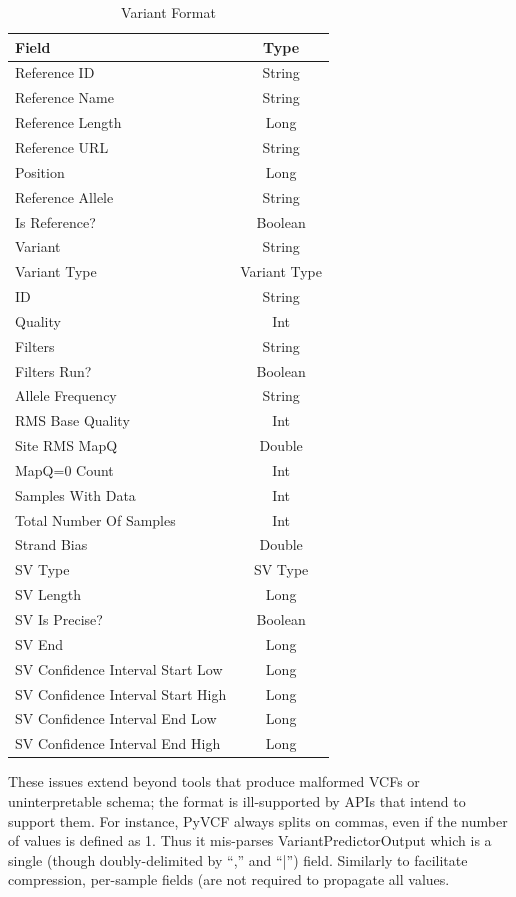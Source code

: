 \documentclass[10pt,twocolumn]{article}
\theoremstyle{plain}
\begin{document}
\begin{table}
\caption{Variant Format}
\label{tab:variant-format}
\begin{center}
\begin{tabular}{| l | c |}
\hline
\bf Field & \bf Type \\
\hline
Reference ID & String \\
Reference Name & String \\
Reference Length & Long \\
Reference URL & String \\
Position & Long \\
Reference Allele & String \\
Is Reference? & Boolean \\
Variant & String \\
Variant Type & Variant Type \\
ID & String \\
Quality & Int \\
Filters & String \\
Filters Run? & Boolean \\
Allele Frequency & String \\
RMS Base Quality & Int \\
Site RMS MapQ & Double \\
MapQ=0 Count & Int \\
Samples With Data & Int \\
Total Number Of Samples & Int \\
Strand Bias & Double \\
SV Type & SV Type \\
SV Length & Long \\
SV Is Precise? & Boolean \\
SV End & Long \\
SV Confidence Interval Start Low & Long \\ 
SV Confidence Interval Start High & Long \\
SV Confidence Interval End Low & Long \\ 
SV Confidence Interval End High & Long \\
\hline
\end{tabular}
\end{center}
\end{table}

These issues extend beyond tools that produce malformed VCFs or uninterpretable schema; the format is ill-supported by APIs that intend to
support them. For instance, PyVCF always splits on commas, even if the number of values is defined as 1. Thus it mis-parses VariantPredictorOutput
which is a single (though doubly-delimited by ``,'' and ``|'') field. Similarly to facilitate compression, per-sample fields (are not required to propagate all values. 
\end{document}

